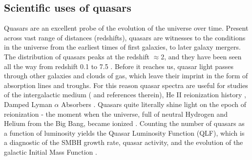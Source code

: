 \documentclass[modern]{aastex62}
\begin{document}
\subsection{Scientific uses of quasars}
Quasars are an excellent probe of the evolution of the universe over time. Present across vast range of distances (redshifts), quasars are witnesses to the conditions in the universe from the earliest times of first galaxies, to later galaxy mergers.  The distribution of quasars peaks at the redshift $\approx$2, and they have been seen all the way from redshift 0.1 to 7.5 \citep{paris2017, banados2018}. Before it reaches us, quasar light passes through other galaxies and clouds of gas, which leave their imprint  in the form of absorption lines and troughs.  For this reason quasar spectra are useful  for studies of the intergalactic medium (\cite{prochaska2014} and references therein),  He II reionization history \citep{khrykin2017}, Damped Lyman $\alpha$ Absorbers \citep{wolfe2005,murphy2016,parks2018}.  Quasars quite literally shine light on the epoch of reionization - the moment when the universe, full of neutral Hydrogen and Helium from the Big Bang, became ionized \citep{glikman2011, masters2012, ross2013}. Counting the number of quasars as a function of luminosity yields the Quasar Luminosity Function (QLF), which is a diagnostic of the SMBH growth rate, quasar activity, and the evolution of the galactic Initial Mass Function \citep{schawinski2012,mcgreer2013,alsayyad2016}. 
\end{document}
